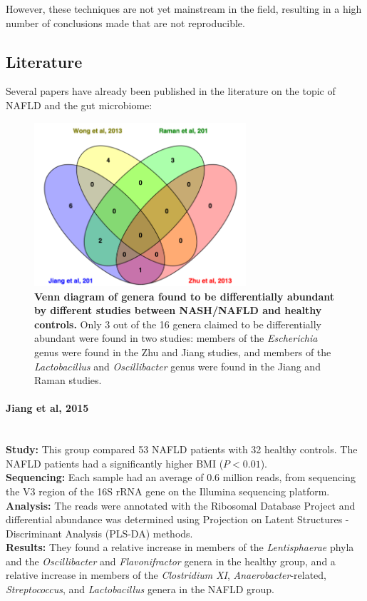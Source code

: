 However, these techniques are not yet mainstream in the field, resulting in a high number of conclusions made that are not reproducible.

\subsection{Literature}
Several papers have already been published in the literature on the topic of NAFLD and the gut microbiome:

\begin{figure}[h]
\begin{center}
\includegraphics[width=0.7\textwidth]{nafld_papers.png}
\caption{\textbf{Venn diagram of genera found to be differentially abundant by different studies between NASH/NAFLD and healthy controls.} Only 3 out of the 16 genera claimed to be differentially abundant were found in two studies: members of the \textit{Escherichia} genus were found in the Zhu \cite{zhu2013characterization} and Jiang \cite{jiang2015dysbiosis} studies, and members of the \textit{Lactobacillus} and \textit{Oscillibacter} genus were found in the Jiang \cite{jiang2015dysbiosis} and Raman \cite{raman2013fecal} studies.}
\end{center}
\label{nafld_fig1}
\end{figure}

\paragraph{Jiang et al, 2015 \cite{jiang2015dysbiosis}}\mbox{}\\
\textbf{Study:} This group compared 53 NAFLD patients with 32 healthy controls. The NAFLD patients had a significantly higher BMI ($P<0.01$).\\
\textbf{Sequencing:} Each sample had an average of 0.6 million reads, from sequencing the V3 region of the 16S rRNA gene on the Illumina sequencing platform.\\
\textbf{Analysis:} The reads were annotated with the Ribosomal Database Project \cite{cole2009ribosomal} and differential abundance was determined using Projection on Latent Structures - Discriminant Analysis (PLS-DA) methods.\\
\textbf{Results:} They found a relative increase in members of the \textit{Lentisphaerae} phyla and the \textit{Oscillibacter} and \textit{Flavonifractor} genera in the healthy group, and a relative increase in members of the \textit{Clostridium XI}, \textit{Anaerobacter}-related, \textit{Streptococcus}, and \textit{Lactobacillus} genera in the NAFLD group.

